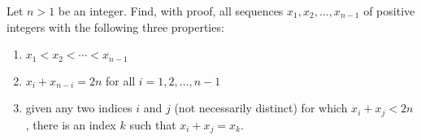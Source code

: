 Let $n > 1$ be an integer. Find, with proof, all sequences $x_1 , x_2 , \ldots , x_{n-1}$ of positive integers with the following three properties:
\begin{enumerate}[label=(\alph*)]
	\item $x_1 < x_2 < \cdots < x_{n-1}$
	\item $x_i + x_{n-i} = 2n$ for all $i = 1, 2, \ldots , n - 1$
	\item given any two indices $i$ and $j$ (not necessarily distinct) for which $x_i + x_j < 2n$, there is an index $k$ such that $x_i + x_j = x_k$.
\end{enumerate}